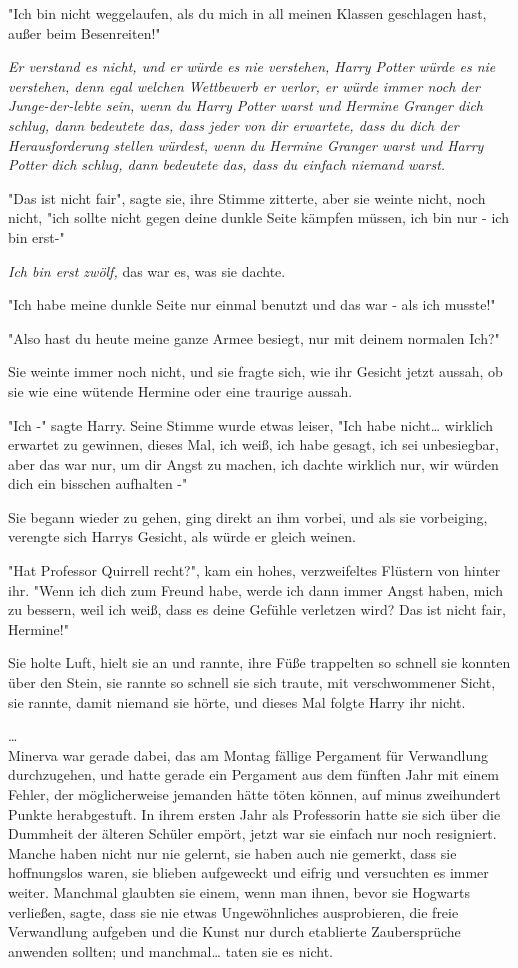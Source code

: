 {"Ich bin nicht weggelaufen, als du mich in all meinen Klassen geschlagen hast, außer beim Besenreiten!"

\emph{Er verstand es nicht, und er würde es nie verstehen, Harry Potter würde es nie verstehen, denn egal welchen Wettbewerb er verlor, er würde immer noch der Junge-der-lebte sein, wenn du Harry Potter warst und Hermine Granger dich schlug, dann bedeutete das, dass jeder von dir erwartete, dass du dich der Herausforderung stellen würdest, wenn du Hermine Granger warst und Harry Potter dich schlug, dann bedeutete das, dass du einfach niemand warst.}

"Das ist nicht fair", sagte sie, ihre Stimme zitterte, aber sie weinte nicht, noch nicht, "ich sollte nicht gegen deine dunkle Seite kämpfen müssen, ich bin nur - ich bin erst-"

\emph{Ich bin erst zwölf,} das war es, was sie dachte.

"Ich habe meine dunkle Seite nur einmal benutzt und das war - als ich musste!"

"Also hast du heute meine ganze Armee besiegt, nur mit deinem normalen Ich?"

Sie weinte immer noch nicht, und sie fragte sich, wie ihr Gesicht jetzt aussah, ob sie wie eine wütende Hermine oder eine traurige aussah.

"Ich -" sagte Harry. Seine Stimme wurde etwas leiser, "Ich habe nicht… wirklich erwartet zu gewinnen, dieses Mal, ich weiß, ich habe gesagt, ich sei unbesiegbar, aber das war nur, um dir Angst zu machen, ich dachte wirklich nur, wir würden dich ein bisschen aufhalten -"

Sie begann wieder zu gehen, ging direkt an ihm vorbei, und als sie vorbeiging, verengte sich Harrys Gesicht, als würde er gleich weinen.

"Hat Professor Quirrell recht?", kam ein hohes, verzweifeltes Flüstern von hinter ihr. "Wenn ich dich zum Freund habe, werde ich dann immer Angst haben, mich zu bessern, weil ich weiß, dass es deine Gefühle verletzen wird? Das ist nicht fair, Hermine!"

Sie holte Luft, hielt sie an und rannte, ihre Füße trappelten so schnell sie konnten über den Stein, sie rannte so schnell sie sich traute, mit verschwommener Sicht, sie rannte, damit niemand sie hörte, und dieses Mal folgte Harry ihr nicht.

…\\ Minerva war gerade dabei, das am Montag fällige Pergament für Verwandlung durchzugehen, und hatte gerade ein Pergament aus dem fünften Jahr mit einem Fehler, der möglicherweise jemanden hätte töten können, auf minus zweihundert Punkte herabgestuft. In ihrem ersten Jahr als Professorin hatte sie sich über die Dummheit der älteren Schüler empört, jetzt war sie einfach nur noch resigniert. Manche haben nicht nur nie gelernt, sie haben auch nie gemerkt, dass sie hoffnungslos waren, sie blieben aufgeweckt und eifrig und versuchten es immer weiter. Manchmal glaubten sie einem, wenn man ihnen, bevor sie Hogwarts verließen, sagte, dass sie nie etwas Ungewöhnliches ausprobieren, die freie Verwandlung aufgeben und die Kunst nur durch etablierte Zaubersprüche anwenden sollten; und manchmal… taten sie es nicht.

}
